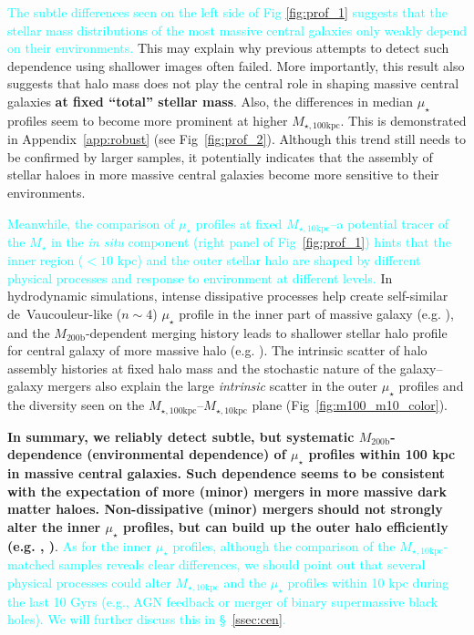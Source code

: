 \documentclass[a4paper,fleqn,usenatbib]{mnras}
\def\mstar{{$M_{\star}$}}
\def\mhalo{{$M_{\mathrm{200b}}$}}
\def\minn{{$M_{\star,10\mathrm{kpc}}$}}
\def\mtot{{$M_{\star,100\mathrm{kpc}}$}}
\def\mden{{$\mu_{\star}$}}
\newcommand{\song}[1]{\textcolor{cyan}{#1}}
\begin{document}
    \song{
    The subtle differences seen on the left side of Fig \ref{fig:prof_1} suggests
    that the stellar mass distributions of the most massive central galaxies only
    weakly depend on their environments. 
    }
    This may explain why previous attempts to detect such dependence using 
    shallower images often failed. 
    More importantly, this result also suggests that halo mass does not play the 
    central role in shaping massive central galaxies \textbf{at fixed ``total'' 
    stellar mass}.
    Also, the differences in median \mden{} profiles seem to become more prominent 
    at higher \mtot{}. 
    This is demonstrated in Appendix~\ref{app:robust} (see Fig~\ref{fig:prof_2}). 
    Although this trend still needs to be confirmed by larger samples, it 
    potentially indicates that the assembly of stellar haloes in more massive 
    central galaxies become more sensitive to their environments.   
     
    \song{
    Meanwhile, the comparison of \mden{} profiles at fixed \minn{}--a potential 
    tracer of the \mstar{} in the \textit{in situ} component (right panel of 
    Fig~\ref{fig:prof_1}) hints that the inner region ($<10$ kpc) and the outer 
    stellar halo are shaped by different physical processes and response to 
    environment at different levels. 
    }  
    In hydrodynamic simulations, intense dissipative processes help create 
    self-similar de~Vaucouleur-like ($n{\sim} 4$) \mden{} profile in the inner part 
    of massive galaxy (e.g. \citealt{Hopkins2008}), and the \mhalo{}-dependent
    merging history leads to shallower stellar halo profile for central galaxy 
    of more massive halo (e.g. \citealt{Pillepich2014}). 
    The intrinsic scatter of halo assembly histories at fixed halo mass and the 
    stochastic nature of the galaxy--galaxy mergers also explain the large 
    \textit{intrinsic} scatter in the outer \mden{} profiles and the diversity 
    seen on the \mtot{}--\minn{} plane (Fig~\ref{fig:m100_m10_color}).

    \textbf{In summary, we reliably detect subtle, but systematic \mhalo{}-dependence 
    (environmental dependence) of \mden{} profiles within 100 kpc in massive central 
    galaxies. 
    Such dependence seems to be consistent with the expectation of more (minor) 
    mergers in more massive dark matter haloes. 
    Non-dissipative (minor) mergers should not strongly alter the inner \mden{} 
    profiles, but can build up the outer halo efficiently
    (e.g. \citealt{Hilz2013}, \citealt{Oogi2013})}.
    \song{
    As for the inner \mden{} profiles, although the comparison of the \minn{}-matched
    samples reveals clear differences, we should point out that several physical 
    processes could alter \minn{} and the \mden{} profiles within 10 kpc during the
    last 10 Gyrs (e.g., AGN feedback or merger of binary supermassive black holes). 
    We will further discuss this in \S~\ref{ssec:cen}.
    }
      
\end{document}
